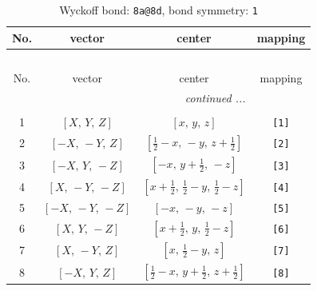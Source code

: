 \documentclass[fleqn,8pt]{jsarticle}
\begin{document}
\begin{longtable}{cccc}
\caption{Wyckoff bond: {\tt 8a@8d}, bond symmetry: {\tt 1}}
 \\
 \hline \hline
No. & vector & center & mapping \\ \hline \endfirsthead

\multicolumn{3}{l}{\tablename\ \thetable{}} \\
 \hline \hline
No. & vector & center & mapping \\ \hline \endhead

 \hline \hline
\multicolumn{3}{r}{\footnotesize\it continued ...} \\ \endfoot

 \hline \hline
\multicolumn{3}{r}{} \\ \endlastfoot

1 & $\left[ X,\, Y,\, Z \right]$ & $\left[ x,\, y,\, z \right]$ & {\tt [1]} \\ \hline
2 & $\left[ - X,\, - Y,\, Z \right]$ & $\left[ \frac{1}{2} - x,\, - y,\, z + \frac{1}{2} \right]$ & {\tt [2]} \\ \hline
3 & $\left[ - X,\, Y,\, - Z \right]$ & $\left[ - x,\, y + \frac{1}{2},\, - z \right]$ & {\tt [3]} \\ \hline
4 & $\left[ X,\, - Y,\, - Z \right]$ & $\left[ x + \frac{1}{2},\, \frac{1}{2} - y,\, \frac{1}{2} - z \right]$ & {\tt [4]} \\ \hline
5 & $\left[ - X,\, - Y,\, - Z \right]$ & $\left[ - x,\, - y,\, - z \right]$ & {\tt [5]} \\ \hline
6 & $\left[ X,\, Y,\, - Z \right]$ & $\left[ x + \frac{1}{2},\, y,\, \frac{1}{2} - z \right]$ & {\tt [6]} \\ \hline
7 & $\left[ X,\, - Y,\, Z \right]$ & $\left[ x,\, \frac{1}{2} - y,\, z \right]$ & {\tt [7]} \\ \hline
8 & $\left[ - X,\, Y,\, Z \right]$ & $\left[ \frac{1}{2} - x,\, y + \frac{1}{2},\, z + \frac{1}{2} \right]$ & {\tt [8]} \\
\end{longtable}
\end{document}
